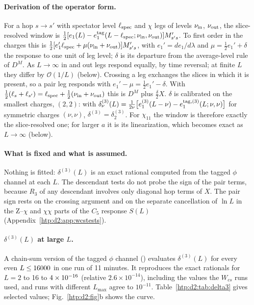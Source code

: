 \paragraph{Derivation of the operator form.} For a hop $s\to s'$ with spectator level $\ell_{\rm spec}$ and $\chi$ legs of
levels $\nu_{\rm in}$, $\nu_{\rm out}$, the slice-resolved window is $\frac12[e_1(L)-e_1^{\rm tag}(L-\ell_{\rm spec};\nu_{\rm
in},\nu_{\rm out})]M'_{s's}$. To first order in the charges this is $\frac12[e_1'\ell_{\rm spec}+\mu(\nu_{\rm in}+\nu_{\rm
out})]M'_{s's}$, with $e_1'=de_1/d\lambda$ and $\mu=\frac12e_1'+\delta$ the response to one unit of leg level; $\delta$ is its
departure from the average-level rule of $D^M$. As $L\to\infty$ in and out legs respond equally, by time reversal; at finite
$L$ they differ by $\mathcal O(1/L)$ (below). Crossing a leg exchanges the slices in which it is present, so a pair leg
responds with $e_1'-\mu=\frac12e_1'-\delta$. With $\frac12(\ell_s+\ell_{s'})=\ell_{\rm spec}+\frac12(\nu_{\rm in}+\nu_{\rm out})$ this is $D^M$
plus $\frac\delta2X$. $\delta$ is calibrated on the smallest charges, $(2,2)$: with
$\delta^{(3)}_\nu(L)=\frac1{2\nu}\big[e_1^{(3)}(L-\nu)-e_1^{{\rm tag},(3)}(L;\nu,\nu)\big]$ for symmetric charges $(\nu,\nu)$,
$\delta^{(3)}=\delta^{(3)}_2$. For $\chi_{11}$ the window is therefore exactly
the slice-resolved one; for larger $a$ it is its linearization, which becomes exact as $L\to\infty$ (below).

\paragraph{What is fixed and what is assumed.} Nothing is fitted: $\delta^{(3)}(L)$ is an exact rational computed from the
tagged $\phi$ channel at each $L$. The descendant tests do not probe the sign of the pair terms, because $R_3$ of any
descendant involves only diagonal hop terms of $X$. The pair sign rests on the crossing argument and on the separate
cancellation of $\ln L$ in the Z--$\chi$ and $\chi\chi$ parts of the $C_5$ response $S(L)$ (Appendix~\ref{htp:d2:app:wcstests}).

\paragraph{$\delta^{(3)}(L)$ at large $L$.} A chain-sum version of the tagged $\phi$ channel
() evaluates $\delta^{(3)}(L)$ for every even $L\le16000$ in one run of 11
minutes. It reproduces the exact rationals for $L=2$ to 16 to $4\times10^{-16}$ (relative $2.6\times10^{-14}$), including
the values the $W_{cs}$ runs used, and runs with different $L_{\max}$ agree to $10^{-11}$. Table~\ref{htp:d2:tab:delta3} gives
selected values; Fig.~\ref{htp:d2:fig}b shows the curve.

